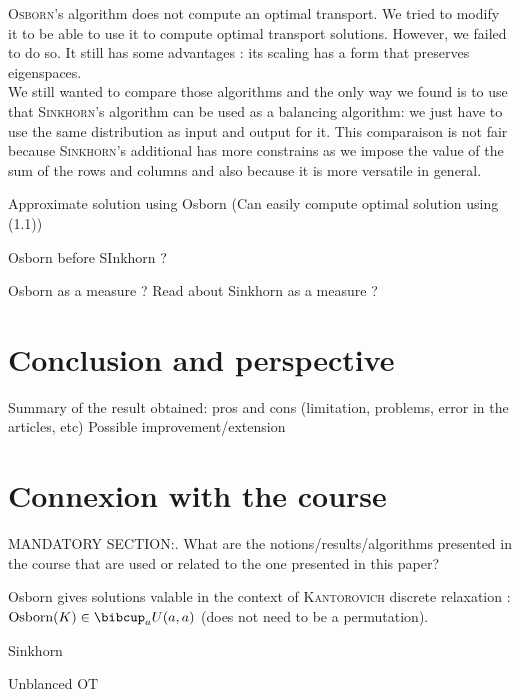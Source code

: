 \textsc{Osborn}'s algorithm does not compute an optimal transport. We tried to modify it to be able to use it to compute optimal transport solutions. However, we failed to do so. It still has some advantages : its scaling has a form that preserves eigenspaces.\\

We still wanted to compare those algorithms and the only way we found is to use that \textsc{Sinkhorn}'s algorithm can be used as a balancing algorithm: we just have to use the same distribution as input and output for it. This comparaison is not fair because \textsc{Sinkhorn}'s additional has more constrains as we impose the value of the sum of the rows and columns and also because it is more versatile in general.




\cite{peyre2011numerical}


Approximate solution using Osborn (Can easily compute optimal solution using (1.1))

Osborn before SInkhorn ?


Osborn as a measure ? Read about Sinkhorn as a measure ?


\section{Conclusion and perspective}

Summary of the result obtained: pros and cons (limitation, problems, error in the articles, etc)
Possible improvement/extension 

\section{Connexion with the course}

MANDATORY SECTION:. What are the notions/results/algorithms presented in the course that are used or related to the one presented in this paper?

Osborn gives solutions valable in the context of \textsc{Kantorovich} discrete relaxation : \(\text{Osborn}(K) \in \bibcup_a U(a,a)\) (does not need to be a permutation). 

Sinkhorn

Unblanced OT

\listoftodos{}

\newpage
\printbibliography[heading=bibintoc]

